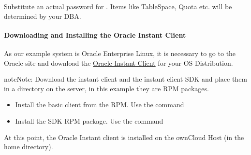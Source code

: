 \documentclass[letterpaper,10pt,english]{sphinxmanual}
\begin{document}
Substitute an actual password for .  Items like TableSpace, Quota etc. will be determined by your DBA.


\paragraph{Downloading and Installing the Oracle Instant Client}
\label{enterprise_installation/oracle_db_configuration:downloading-and-installing-the-oracle-instant-client}
As our example system is Oracle Enterprise Linux, it is
necessary to go to the Oracle site and download the \href{http://www.oracle.com/technetwork/database/features/instant-client/index-097480.html}{Oracle Instant Client} for
your OS Distribution.

\begin{notice}{note}{Note:}
Download the instant client and the instant client SDK and place them
in a directory on the server, in this example they are RPM packages.
\end{notice}
\begin{itemize}
\item {} 
Install the basic client from the RPM.  Use the  command

\item {} 
Install the SDK RPM package.  Use the  command

\end{itemize}

At this point, the Oracle Instant client is installed on the ownCloud Host (in
the home directory).
\end{document}
